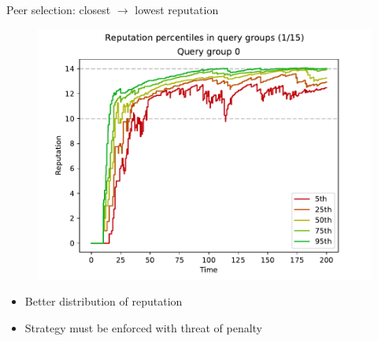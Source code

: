 \documentclass[presentation,english,usenames,dvipsnames]{beamer}
\begin{document}
\begin{frame}{Peer selection: closest $\rightarrow$ lowest reputation}
  \begin{minipage}{0.5\textwidth}
    \begin{figure}
      \centering
      \includegraphics[width=1\textwidth]{figures/selection_overlap_rep_sorted_rep_percs_1_of_15}
    \end{figure}
  \end{minipage}%
  \begin{minipage}{0.5\textwidth}
    \begin{itemize}
      \item Better distribution of reputation
      \item Strategy must be enforced with threat of penalty
    \end{itemize}
  \end{minipage}
\end{frame}
\end{document}
